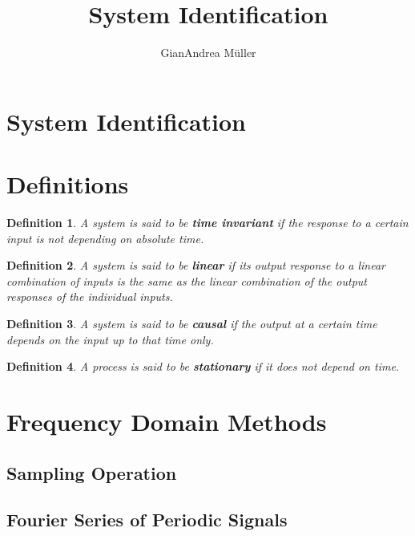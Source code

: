 \documentclass[10pt,a4paper]{scrartcl}
\title{System Identification}
\author{GianAndrea Müller}
\newtheorem{define}{Definition}
\begin{document}
\begin{multicols*}{4}
\maketitle
\tableofcontents
\end{multicols*}

\begin{multicols*}{2}
\section{System Identification}
\section{Definitions}

\begin{define}
A system is said to be \textbf{time invariant} if the response to a certain input is not depending on absolute time.
\end{define}

\begin{define}
A system is said to be \textbf{linear} if its output response to a linear combination of inputs is the same as the linear combination of the output responses of the individual inputs.
\end{define}

\begin{define}
A system is said to be \textbf{causal} if the output at a certain time depends on the input up to that time only.
\end{define}

\begin{define}
A process is said to be \textbf{stationary} if it does not depend on time.
\end{define}

\section{Frequency Domain Methods}

\subsection{Sampling Operation}


\subsection{Fourier Series of Periodic Signals}


\end{multicols*}
\end{document}

